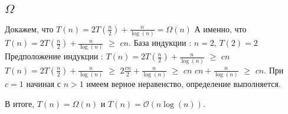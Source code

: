 \documentclass{article}
\begin{document}
\subsection{$\Omega$}
Докажем, что $T(n) = 2T(\frac{n}{2}) + \frac{n}{\log(n)} = \Omega(n)$
\newline
А именно, что $T(n) = 2T(\frac{n}{2}) + \frac{n}{\log(n)}$ $\geq$ $cn$.
\newline
База индукции : $n = 2$, $T(2) = 2$ 
\newline
Предположение индукции : $T(n) = 2T(\frac{n}{2}) + \frac{n}{\log(n)}$ $\geq$ $cn$
\newline%
$T(n) = 2T(\frac{n}{2}) + \frac{n}{\log(n)}$ $\geq$ $2\frac{cn}{2} + \frac{n}{\log(n)}$ $\geq$ $cn$
\newline
$cn + \frac{n}{\log(n)}$ $\geq$ $cn$. При $c = 1$ начиная с $n > 1$ имеем верное неравенство, определение выполняется.
\newline

В итоге, $T(n) = \Omega(n)$ и $T(n) = \mathcal{O}(n\log(n))$.
\end{document}
